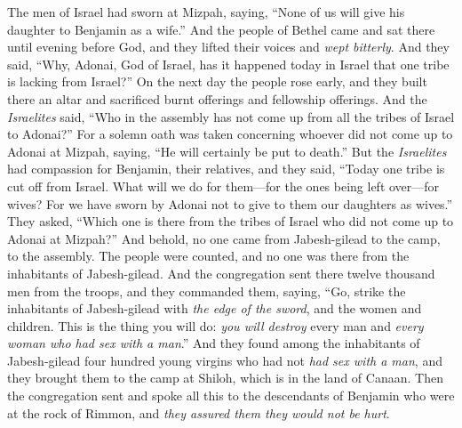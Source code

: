 \begin{biblechapter} %
 The men of Israel had sworn at Mizpah, saying, “None of us will give his daughter to Benjamin as a wife.”
\verse And the people of Bethel came and sat there until evening before God, and they lifted their voices and \textit{wept bitterly}.
\verse And they said, “Why, Adonai, God of Israel, has it happened today in Israel that one tribe is lacking from Israel?”
\verse On the next day the people rose early, and they built there an altar and sacrificed burnt offerings and fellowship offerings.
\verse And the \textit{Israelites} said, “Who in the assembly has not come up from all the tribes of Israel to Adonai?” For a solemn oath was taken concerning whoever did not come up to Adonai at Mizpah, saying, “He will certainly be put to death.”
\verse But the \textit{Israelites} had compassion for Benjamin, their relatives, and they said, “Today one tribe is cut off from Israel.
\verse What will we do for them—for the ones being left over—for wives? For we have sworn by Adonai not to give to them our daughters as wives.”
\verse They asked, “Which one is there from the tribes of Israel who did not come up to Adonai at Mizpah?” And behold, no one came from Jabesh-gilead to the camp, to the assembly.
\verse The people were counted, and no one was there from the inhabitants of Jabesh-gilead.
\verse And the congregation sent there twelve thousand men from the troops, and they commanded them, saying, “Go, strike the inhabitants of Jabesh-gilead with \textit{the edge of the sword}, and the women and children.
\verse This is the thing you will do: \textit{you will destroy} every man and \textit{every woman who had sex with a man}.”
\verse And they found among the inhabitants of Jabesh-gilead four hundred young virgins who had not \textit{had sex with a man}, and they brought them to the camp at Shiloh, which is in the land of Canaan.
\verse Then the congregation sent and spoke all this to the descendants of Benjamin who were at the rock of Rimmon, and \textit{they assured them they would not be hurt}.

\end{biblechapter}
